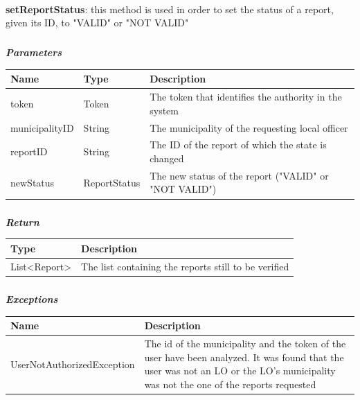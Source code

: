 					\paragraph{}
							\textbf{setReportStatus}: this method is used in order to set the status of a report, given its ID, to "VALID" or "NOT VALID"
							\subparagraph{}
							\textit{\textbf{Parameters}}
								\begin{table}[!h]
									\begin{tabular}{L{0.2\textwidth}L{0.2\textwidth}L{0.2\textwidth}}
										\toprule
										Name & Type & Description \\
										\midrule
								  		token & Token & The token that identifies the authority in the system \\
								  		municipalityID & String & The municipality of the requesting local officer \\
								  		reportID & String & The ID of the report of which the state is changed \\
								  		newStatus & ReportStatus & The new status of the report ("VALID" or "NOT VALID") \\
								 		\bottomrule
									\end{tabular}
								\end{table}
							\subparagraph{}
								\textit{\textbf{Return}}
									\begin{table}[!h]
									\begin{tabular}{L{0.3\textwidth}L{0.3\textwidth}}
										\toprule
										Type & Description \\
										\midrule
								  		List<Report> & The list containing the reports still to be verified \\
								 		\bottomrule
									\end{tabular}
								\end{table}
							\subparagraph{}
								\textit{\textbf{Exceptions}}
									\begin{table}[!h]
									\begin{tabular}{L{0.3\textwidth}L{0.3\textwidth}}
										\toprule
										Name & Description \\
										\midrule
								  	UserNotAuthorizedException & The id of the municipality and the token of the user have been analyzed. It was found that the user was not an LO or the LO's municipality was not the one of the reports requested \\
								 		\bottomrule
									\end{tabular}
								\end{table}

